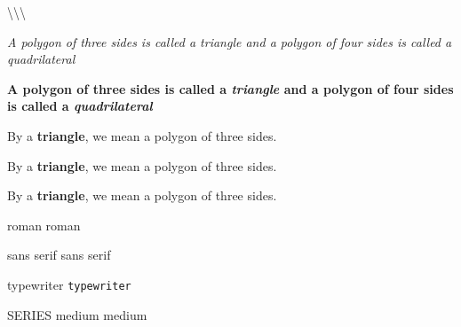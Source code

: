 \documentclass{article}
\begin{document}
\textbackslash \textbackslash \textbackslash







\textit{A polygon of three sides is called a \emph{triangle} and a
polygon of four sides is called a \emph{quadrilateral}}


\textbf{A polygon of three sides is called a
\emph{triangle} and a polygon of four sides is called a
\emph{quadrilateral}}




By a \textbf{triangle}, we mean a polygon of three sides.


By a {\bfseries{triangle}}, we mean a polygon of three sides.

By a {\bfseries triangle}, we mean a polygon of three sides.





roman \textrm{roman}

sans serif \textsf{sans serif}

typewriter \texttt{typewriter}

SERIES
medium \textmd{medium}
\end{document}
